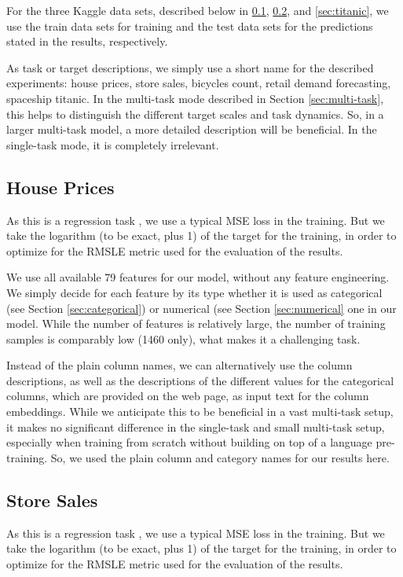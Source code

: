\documentclass{article}
\begin{document}
For the three Kaggle data sets, described below in \ref{sec:house-prices}, \ref{sec:store-sales}, and \ref{sec:titanic}, we use the train data sets for training and the test data sets for the predictions stated in the results, respectively.

As task or target descriptions, we simply use a short name for the described experiments: house prices, store sales, bicycles count, retail demand forecasting, spaceship titanic. In the multi-task mode described in Section \ref{sec:multi-task}, this helps to distinguish the different target scales and task dynamics. So, in a larger multi-task model, a more detailed description will be beneficial. In the single-task mode, it is completely irrelevant.

\subsection{House Prices}
\label{sec:house-prices}
As this is a regression task \cite{house-prices}, we use a typical MSE loss in the training. But we take the logarithm (to be exact, plus 1) of the target for the training, in order to optimize for the RMSLE metric used for the evaluation of the results.

We use all available 79 features for our model, without any feature engineering. We simply decide for each feature by its type whether it is used as categorical (see Section \ref{sec:categorical}) or numerical (see Section \ref{sec:numerical} one in our model. While the number of features is relatively large, the number of training samples is comparably low (1460 only), what makes it a challenging task.

Instead of the plain column names, we can alternatively use the column descriptions, as well as the descriptions of the different values for the categorical columns, which are provided on the web page, as input text for the column embeddings. While we anticipate this to be beneficial in a vast multi-task setup, it makes no significant difference in the single-task and small multi-task setup, especially when training from scratch without building on top of a language pre-training. So, we used the plain column and category names for our results here.

\subsection{Store Sales}
\label{sec:store-sales}
As this is a regression task \cite{store-sales}, we use a typical MSE loss in the training. But we take the logarithm (to be exact, plus 1) of the target for the training, in order to optimize for the RMSLE metric used for the evaluation of the results.
\end{document}
